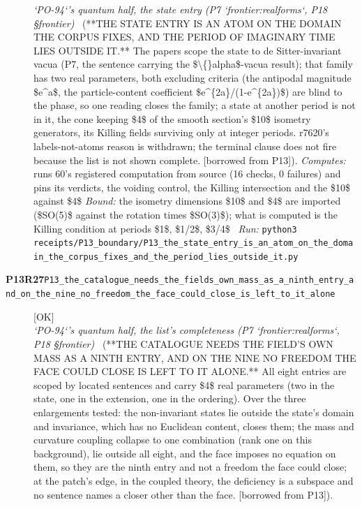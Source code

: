 \begin{description}
\textit{`PO-94`'s quantum half, the state entry (P7 `frontier:realforms`, P18 \S{}frontier)} \ (**THE STATE ENTRY IS AN ATOM ON THE DOMAIN THE CORPUS FIXES, AND THE PERIOD OF IMAGINARY TIME LIES OUTSIDE IT.** The papers scope the state to de Sitter-invariant vacua (P7, the sentence carrying the \$\textbackslash\{\}alpha\$-vacua result); that family has two real parameters, both excluding criteria (the antipodal magnitude \$e\textasciicircum{}a\$, the particle-content coefficient \$e\textasciicircum{}\{2a\}/(1-e\textasciicircum{}\{2a\})\$) are blind to the phase, so one reading closes the family; a state at another period is not in it, the cone keeping \$4\$ of the smooth section's \$10\$ isometry generators, its Killing fields surviving only at integer periods. r7620's labels-not-atoms reason is withdrawn; the terminal clause does not fire because the list is not shown complete. [borrowed from P13]). 
\emph{Computes:} runs 60's registered computation from source (16 checks, 0 failures) and pins its verdicts, the voiding control, the Killing intersection and the \$10\$ against \$4\$
 \emph{Bound:} the isometry dimensions \$10\$ and \$4\$ are imported (\$SO(5)\$ against the rotation times \$SO(3)\$); what is computed is the Killing condition at periods \$1\$, \$1/2\$, \$3/4\$
\ \emph{Run:} \texttt{python3 receipts/P13\_boundary/P13\_the\_state\_entry\_is\_an\_atom\_on\_the\_domain\_the\_corpus\_fixes\_and\_the\_period\_lies\_outside\_it.py}
\item[\rcptlabel{P13_the_catalogue_needs_the_fields_own_mass_as_a_ninth_entry_and_on_the_nine_no_freedom_the_face_could_close_is_left_to_it_alone}{P13R27}\textbf{P13R27}\quad\texttt{P13\_the\_catalogue\_needs\_the\_fields\_own\_mass\_as\_a\_ninth\_entry\_and\_on\_the\_nine\_no\_freedom\_the\_face\_could\_close\_is\_left\_to\_it\_alone}]\hfill\textsf{[OK]}\\
\textit{`PO-94`'s quantum half, the list's completeness (P7 `frontier:realforms`, P18 \S{}frontier)} \ (**THE CATALOGUE NEEDS THE FIELD'S OWN MASS AS A NINTH ENTRY, AND ON THE NINE NO FREEDOM THE FACE COULD CLOSE IS LEFT TO IT ALONE.** All eight entries are scoped by located sentences and carry \$4\$ real parameters (two in the state, one in the extension, one in the ordering). Over the three enlargements tested: the non-invariant states lie outside the state's domain and invariance, which has no Euclidean content, closes them; the mass and curvature coupling collapse to one combination (rank one on this background), lie outside all eight, and the face imposes no equation on them, so they are the ninth entry and not a freedom the face could close; at the patch's edge, in the coupled theory, the deficiency is a subspace and no sentence names a closer other than the face. [borrowed from P13]). 

\end{description}
